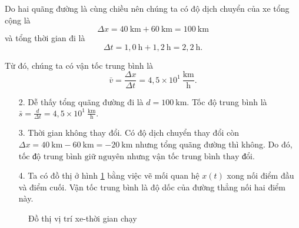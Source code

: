 \documentclass[a4paper, titlepage, openany]{book}
\begin{document}
Do hai quãng đường là cùng chiều nên chúng ta có độ dịch chuyển của xe tổng cộng là $$\Delta x=40\ \text{km} + 60\ \text{km} = 100\ \text{km}$$ và tổng thời gian đi là $$\Delta t =1{,}0\ \text{h}+1{,}2\ \text{h}=2{,}2\ \text{h}.$$

Từ đó, chúng ta có vận tốc trung bình là $$\bar{v} = \frac{\Delta x}{\Delta t} =\boxed{4{,}5\times10^1\ \frac{\text{km}}{\text{h}}}.$$

\begin{enumerate}
   \item[2.] Dễ thấy tổng quãng đường đi là $d=100\ \text{km}$. Tốc độ trung bình là $\bar{s} = \frac{d}{\Delta t}=\boxed{4{,}5\times10^1\ \frac{\text{km}}{\text{h}}}.$
   \item[3.] Thời gian không thay đổi. Có độ dịch chuyển thay đổi còn $\Delta x = 40\ \text{km} - 60\ \text{km} = -20\ \text{km}$ nhưng tổng quãng đường thì không. Do đó, $\boxed{\text{tốc độ trung bình giữ nguyên}}$ nhưng $\boxed{\text{vận tốc trung bình thay đổi}}$.
   \item[4.] Ta có đồ thị ở hình \ref{fig:do_thi_xe} bằng việc vẽ mối quan hệ $x(t)$ xong nối điểm đầu và điểm cuối. Vận tốc trung bình là độ dốc của đường thẳng nối hai điểm này.
\end{enumerate}

\begin{figure}[h]
   \centering
   \caption{Đồ thị vị trí xe-thời gian chạy}
   \label{fig:do_thi_xe}
\end{figure}
\end{document}
